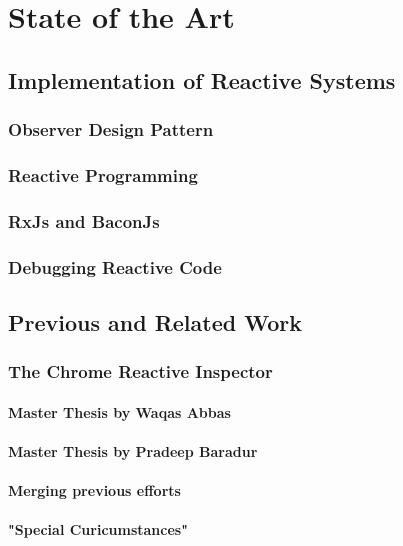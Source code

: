 \chapter{State of the Art} \label{chap:State of the Art}

\section{Implementation of Reactive Systems}

	\subsection{Observer Design Pattern}

	\subsection{Reactive Programming}

	\subsection{RxJs and BaconJs}

	\subsection{Debugging Reactive Code}


\section{Previous and Related Work}
	\subsection{The Chrome Reactive Inspector}
		\subsubsection{Master Thesis by Waqas Abbas}
		\subsubsection{Master Thesis by Pradeep Baradur}
		\subsubsection{Merging previous efforts}
		\subsubsection{"Special Curicumstances"}
	

